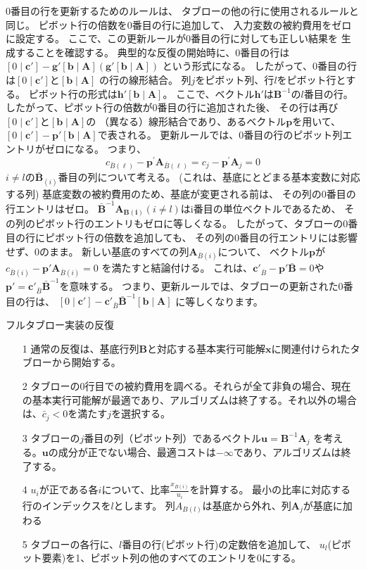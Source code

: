 \documentclass{jsarticle}
\begin{document}
0番目の行を更新するためのルールは、
タブローの他の行に使用されるルールと同じ。
ピボット行の倍数を0番目の行に追加して、
入力変数の被約費用をゼロに設定する。
ここで、この更新ルールが0番目の行に対しても正しい結果を
生成することを確認する。
典型的な反復の開始時に、0番目の行は
$[0\mid \bm{c}']-\bm{g}'[\bm{b}\mid \bm{A}](\bm{g}'[\bm{b}\mid \bm{A}])$
という形式になる。
したがって、0番目の行は$[0\mid \bm{c}']$と$[\bm{b}\mid \bm{A}]$
の行の線形結合。
列$j$をピボット列、行$l$をピボット行とする。
ピボット行の形式は$\bm{h}'[\bm{b}\mid \bm{A}]$。
ここで、ベクトル$\bm{h}'$は$\bm{B}^{-1}$の$l$番目の行。
したがって、ピボット行の倍数が0番目の行に追加された後、
その行は再び$[0\mid \bm{c}']$と$[\bm{b}\mid \bm{A}]$の
（異なる）線形結合であり、あるベクトル$\bm{p}$を用いて、
$[0\mid \bm{c}']-\bm{p}'[\bm{b}\mid \bm{A}]$で表される。
更新ルールでは、0番目の行のピボット列エントリがゼロになる。
つまり、
\begin{equation}
  c_{\bar{B}(\ell)}-\mathbf{p}^{\prime} \mathbf{A}_{\bar{B}(\ell)}=c_{j}-\mathbf{p}^{\prime} \mathbf{A}_{j}=0
\end{equation}
$i\neq l$の$\bar{\bm{B}}_{(i)}$番目の列について考える。
(これは、基底にとどまる基本変数に対応する列)
基底変数の被約費用のため、基底が変更される前は、
その列の0番目の行エントリはゼロ。
$\bar{\bm{B}}^{-1}\bm{A_{B(i)}}(i\neq l)$はi番目の単位ベクトルであるため、
その列のピボット行のエントリもゼロに等しくなる。
したがって、タブローの0番目の行にピボット行の倍数を追加しても、
その列の0番目の行エントリには影響せず、0のまま。
新しい基底のすべての列$\bm{A}_{\bar{B}(i)}$について、
ベクトル$\bm{p}$が
$c_{\bar{B}(i)}-\bm{p}'\bm{A}_{\bar{B}(i)}=0$
を満たすと結論付ける。
これは、$\bm{c}'_{\bar{B}}-\bm{p}'\bar{\bm{B}}=0$や
$\bm{p}'=\bm{c}'_{\bar{B}}\bar{\bm{B}}^{-1}$を意味する。
つまり、更新ルールでは、タブローの更新された0番目の行は、
$[0\mid \bm{c}']-\bm{c}'_{\bar{B}}\bar{\bm{B}}^{-1}[\bm{b}\mid \bm{A}]$
に等しくなります。

\begin{itembox}[l]{フルタブロー実装の反復}
  \begin{itemize}
    \item[1] 通常の反復は、基底行列$\bm{B}$と対応する基本実行可能解$\bm{x}$に関連付けられたタブローから開始する。
    \item[2] タブローの0行目での被約費用を調べる。それらが全て非負の場合、現在の基本実行可能解が最適であり、アルゴリズムは終了する。それ以外の場合は、$\bar{c}_j<0$を満たす$j$を選択する。
    \item[3] タブローの$j$番目の列（ピボット列）であるベクトル$\bm{u} =\bm{B}^{-1}\bm{A}_j$
    を考える。$\bm{u}$の成分が正でない場合、最適コストは$-\infty$であり、アルゴリズムは終了する。
    \item[4] $u_i$が正である各$i$について、比率$\frac{x_{B(i)}}{u_i}$を計算する。
    最小の比率に対応する行のインデックスを$l$とします。
    列$A_{B(l)}$は基底から外れ、列$\bm{A}_j$が基底に加わる
    \item[5] タブローの各行に、$l$番目の行(ピボット行)の定数倍を追加して、
    $u_l$(ピボット要素)を1、ピボット列の他のすべてのエントリを0にする。    
  \end{itemize}
\end{itembox}
\end{document}
